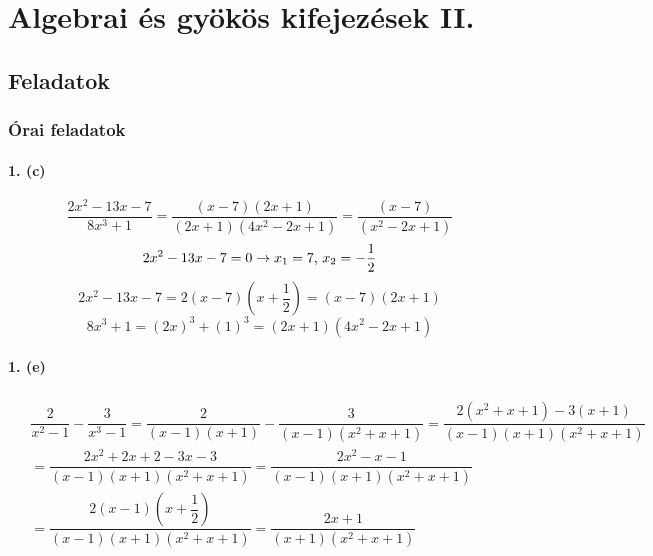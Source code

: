 \documentclass[12pt,a4paper,fleqn]{article}
\newcommand{\myparagraph}[1]{\paragraph{#1}\mbox{}}
\begin{document}
\section{Algebrai és gyökös kifejezések II.}
\setcounter{subsection}{1}
\subsection{Feladatok}
\subsubsection{Órai feladatok}


\myparagraph{1. (c)}
\[ \dfrac{2x^2-13x-7}{8x^3+1} = \dfrac{(x-7)(2x+1)}{(2x+1)(4x^2-2x+1)} =
  \dfrac{(x-7)}{(x^2-2x+1)} \]
\[ 2x^2-13x-7=0 \rightarrow x_1 = 7$, $x_2 = -\dfrac{1}{2} \]
\[ 2x^2-13x-7=2(x-7)(x+\dfrac{1}{2})=(x-7)(2x+1) \]
\[ 8x^3 + 1 = (2x)^3 + (1)^3 = (2x+1)(4x^2-2x+1) \]


\myparagraph{1. (e)}
\begin{align*}
  \begin{split}
    & \dfrac{2}{x^2-1} -\dfrac{3}{x^3-1} = \dfrac{2}{(x-1)(x+1)} - \dfrac{3}{(x-1)(x^2+x+1)} =
        \dfrac{2(x^2+x+1)-3(x+1)}{(x-1)(x+1)(x^2+x+1)} \\[10pt]
    &= \dfrac{2x^2+2x+2-3x-3}{(x-1)(x+1)(x^2+x+1)} = \dfrac{2x^2-x-1}{(x-1)(x+1)(x^2+x+1)} \\[10pt]
    &= \dfrac{2(x-1)(x+\dfrac{1}{2})}{(x-1)(x+1)(x^2+x+1)} = \dfrac{2x+1}{(x+1)(x^2+x+1)}
  \end{split}
\end{align*}
\end{document}
